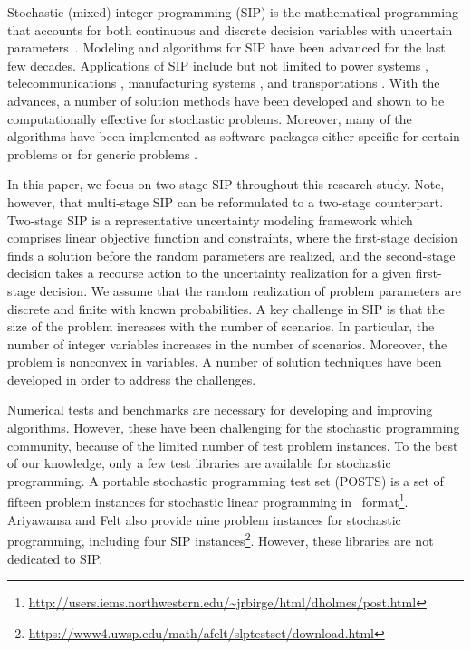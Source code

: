 Stochastic (mixed) integer programming (SIP) is the mathematical programming that accounts for 
both continuous and discrete decision variables with uncertain parameters~\cite{book:BL2011}. 
Modeling and algorithms for SIP have been advanced for the last few decades. Applications of SIP include but not limited to power systems \cite{journal:PO2013,journal:KYZC2017}, telecommunications \cite{journal:SDC1994}, manufacturing systems \cite{journal:SPR1994,journal:AG2004}, and transportations \cite{journal:MW1969,journal:PGM2017,journal:TPP2017,journal:MPT2014}. With the advances, a number of solution methods have been developed and shown to be computationally effective for stochastic problems. Moreover, many of the algorithms have been implemented as software packages either specific for certain problems or for generic problems \cite{SCIP,journal:WWH2012,journal:KZ2015}.

In this paper, we focus on two-stage SIP throughout this research study. Note, however, that multi-stage SIP can be reformulated to a two-stage counterpart. Two-stage SIP is a representative uncertainty modeling framework which comprises linear objective function and constraints, where the first-stage decision finds a solution before the 
random parameters are realized, and the second-stage decision takes a recourse action to the uncertainty realization for a given first-stage decision. We assume that the random realization of problem parameters are discrete and finite with known probabilities.
A key challenge in SIP is that the size of
the problem increases with the number of scenarios. In particular, the number of integer variables increases in the number of scenarios. Moreover, the problem is nonconvex in variables. A number of solution techniques have been developed in order to address the challenges.

Numerical tests and benchmarks are necessary for developing and improving algorithms. However,
these have been challenging for the stochastic programming community, because of the limited number of test problem instances. To the best of our knowledge, only a few test libraries are available for stochastic programming. A portable stochastic programming test set (POSTS) \cite{POSTS} is a set of fifteen problem instances for 
stochastic linear programming in \smps\ format\footnote{\url{http://users.iems.northwestern.edu/~jrbirge/html/dholmes/post.html}}. Ariyawansa and Felt \cite{journal:AF2004} also provide nine problem instances for stochastic programming, including four SIP instances\footnote{\url{https://www4.uwsp.edu/math/afelt/slptestset/download.html}}. However, these libraries are not dedicated to SIP. 

